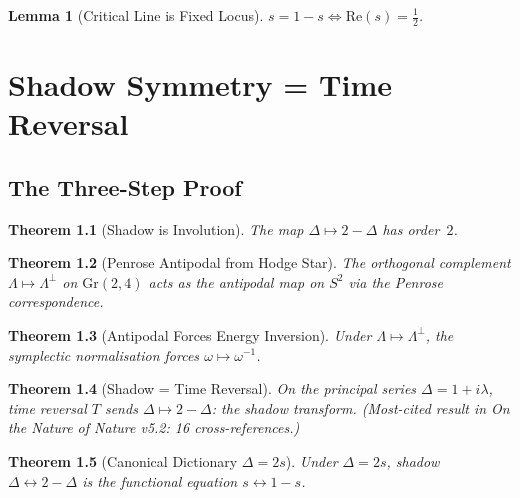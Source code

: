 \documentclass{report}
\newtheorem{theorem}{Theorem}[chapter]
\newtheorem{lemma}[theorem]{Lemma}
\theoremstyle{definition}
\begin{document}
\begin{lemma}[Critical Line is Fixed Locus]
  \label{lem:critical-line-fixed}
  \leanok
  $s = 1-s \iff \mathrm{Re}(s) = \tfrac{1}{2}$.
\end{lemma}

\chapter{Shadow Symmetry = Time Reversal}

\section{The Three-Step Proof}

\begin{theorem}[Shadow is Involution]
  \label{thm:shadow-involution}
  \leanok
  The map $\Delta \mapsto 2-\Delta$ has order~$2$.
\end{theorem}

\begin{theorem}[Penrose Antipodal from Hodge Star]
  \label{thm:penrose-antipodal}
  The orthogonal complement $\Lambda \mapsto \Lambda^\perp$ on $\mathrm{Gr}(2,4)$
  acts as the antipodal map on $S^2$ via the Penrose correspondence.
\end{theorem}

\begin{theorem}[Antipodal Forces Energy Inversion]
  \label{thm:energy-inversion}
  \leanok
  Under $\Lambda \mapsto \Lambda^\perp$, the symplectic normalisation
  forces $\omega \mapsto \omega^{-1}$.
\end{theorem}

\begin{theorem}[Shadow = Time Reversal]
  \label{thm:shadow-cpt}
  \leanok
  On the principal series $\Delta = 1+i\lambda$, time reversal $T$ sends
  $\Delta \mapsto 2-\Delta$: the shadow transform.
  (\emph{Most-cited result in On the Nature of Nature v5.2: 16 cross-references.})
\end{theorem}

\begin{theorem}[Canonical Dictionary $\Delta = 2s$]
  \label{thm:canonical-dict}
  \leanok
  Under $\Delta = 2s$, shadow $\Delta \leftrightarrow 2-\Delta$ is the
  functional equation $s \leftrightarrow 1-s$.
\end{theorem}
\end{document}

